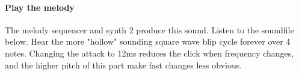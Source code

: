 \paragraph{Play the melody}
The melody sequencer and synth 2 produce this sound. Listen to the
soundfile below. Hear the more "hollow" sounding square wave blip
cycle forever over 4 notes. Changing the attack to 12ms reduces the
click when frequency changes, and the higher pitch of this part
make fast changes less obvious.
